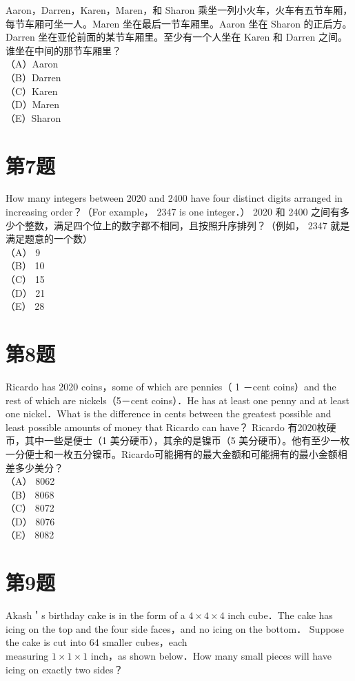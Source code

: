 \documentclass[10pt]{article}
\begin{document}
Aaron，Darren，Karen，Maren，和 Sharon 乘坐一列小火车，火车有五节车厢，每节车厢可坐一人。Maren 坐在最后一节车厢里。Aaron 坐在 Sharon 的正后方。Darren 坐在亚伦前面的某节车厢里。至少有一个人坐在 Karen 和 Darren 之间。谁坐在中间的那节车厢里？\\
（A）Aaron\\
（B）Darren\\
（C）Karen\\
（D）Maren\\
（E）Sharon

\section*{第7题}
How many integers between 2020 and 2400 have four distinct digits arranged in increasing order？（For example， 2347 is one integer．） 2020 和 2400 之间有多少个整数，满足四个位上的数字都不相同，且按照升序排列？（例如， 2347 就是满足题意的一个数）\\
（A） 9\\
（B） 10\\
（C） 15\\
（D） 21\\
（E） 28

\section*{第8题}
Ricardo has 2020 coins，some of which are pennies（ 1 －cent coins）and the rest of which are nickels（5－cent coins）．He has at least one penny and at least one nickel．What is the difference in cents between the greatest possible and least possible amounts of money that Ricardo can have？ Ricardo 有2020枚硬币，其中一些是便士（1 美分硬币），其余的是镍币（5 美分硬币）。他有至少一枚一分便士和一枚五分镍币。Ricardo可能拥有的最大金额和可能拥有的最小金额相差多少美分？\\
（A） 8062\\
（B） 8068\\
（C） 8072\\
（D） 8076\\
（E） 8082

\section*{第9题}
Akash＇s birthday cake is in the form of a $4 \times 4 \times 4$ inch cube．The cake has icing on the top and the four side faces，and no icing on the bottom． Suppose the cake is cut into 64 smaller cubes，each\\
measuring $1 \times 1 \times 1$ inch，as shown below．How many small pieces will have icing on exactly two sides？
\end{document}
